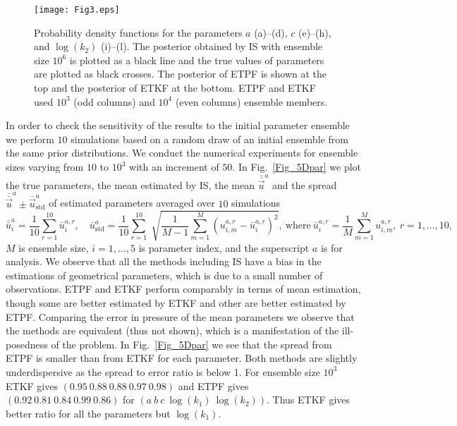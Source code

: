 \documentclass[12, a4paper]{article}
\numberwithin{equation}{section}
\begin{document}

\begin{figure} [t]
	\centering		
	\texttt{[image: Fig3.eps]}	
	\caption{Probability density functions for the parameters $a$ (a)--(d), $c$ (e)--(h), and $\log(k_2)$ (i)--(l). The posterior obtained by IS with ensemble size $10^6$ is plotted as a black line and the true values of parameters are plotted as  black crosses. The posterior of ETPF is shown at the top and the posterior of ETKF at the bottom. ETPF and ETKF used $10^3$ (odd columns) and $10^4$ (even columns) ensemble members. }	
	\label{Fig_5Dpdf}
\end{figure} 

In order to check the sensitivity of the results to the initial parameter ensemble we perform $10$ simulations based on a random draw of an initial ensemble from the same prior distributions. We conduct the numerical experiments for ensemble sizes varying from $10$ to $10^3$ with an increment of $50$.  
In Fig.~\ref{Fig_5Dpar} we plot the true parameters, the mean estimated by IS, 
the mean ${\bar{\bar{\vec{u}}}}^a$ and the spread ${\bar{\bar{\vec{u}}}}^a \pm {\bar{\vec{u}}_\textrm{std}^a}$ 
of estimated parameters averaged over $10$ simulations
\begin{equation*}
{\bar{\bar{u}}}_i^a = \frac{1}{10}\sum_{r=1}^{10} {\bar{u}}_i^{a,r}, \quad
\bar{u}^a_{\textrm{std}}  =\frac{1}{10} \sum_{r=1}^{10}\sqrt[]{\frac{1}{M-1}\sum_{m=1}^{M} (u_{i,m}^{a,r}-\bar{u}_i^{a,r})^2},\ \mbox{where} \ \bar{u}_i^{a,r} =\frac{1}{M}\sum_{m=1}^{M} u_{i,m}^{a,r}, \ r = 1,\hdots,10,
\end{equation*}
$M$ is ensemble size, $i=1,\hdots,5$ is parameter index, and the superscript $a$ is for analysis. 
We observe that all the methods including IS have a bias in the estimations of geometrical
parameters, which is due to a small number of observations.
ETPF and ETKF perform comparably in terms of mean estimation, 
though some are better estimated by ETKF and other are better estimated by ETPF. 
Comparing the error in pressure of the mean parameters we observe that the methods 
are equivalent (thus not shown), which is a manifestation of the ill-posedness of the problem.
In Fig.~\ref{Fig_5Dpar} we see that the spread from ETPF is smaller than from ETKF for each parameter. 
Both methods are slightly underdispersive as the spread to error ratio is below 1. For ensemble size $10^3$ ETKF gives $(0.95\     0.88\    0.88\   0.97\    0.98)$ and ETPF gives $(0.92\    0.81\    0.84\    0.99\    0.86)$ 
for $(a\ b\ c\ \log(k_1)\ \log(k_2))$. Thus ETKF gives better ratio for all the parameters but $\log(k_1)$. 
\end{document}

